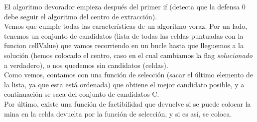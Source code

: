 El algoritmo devorador empieza después del primer if (detecta que la defensa 0 debe seguir el algoritmo del centro de extracción). \\
Vemos que cumple todas las características de un algoritmo voraz. Por un lado, tenemos un conjunto de candidatos (lista de todas las celdas puntuadas con la funcion cellValue) que vamos recorriendo en un bucle hasta que lleguemos a la solución (hemos colocado el centro, caso en el cual cambiamos la flag \emph{solucionado} a verdadero), o nos quedemos sin candidatos (celdas).\\
Como vemos, contamos con una función de selección (sacar el último elemento de la lista, ya que esta está ordenada) que obtiene el mejor candidato posible, y a continuación se saca del conjunto de candidatos C.\\
Por último, existe una función de factibilidad que devuelve si se puede colocar la mina en la celda devuelta por la función de selección, y si es así, se coloca.
